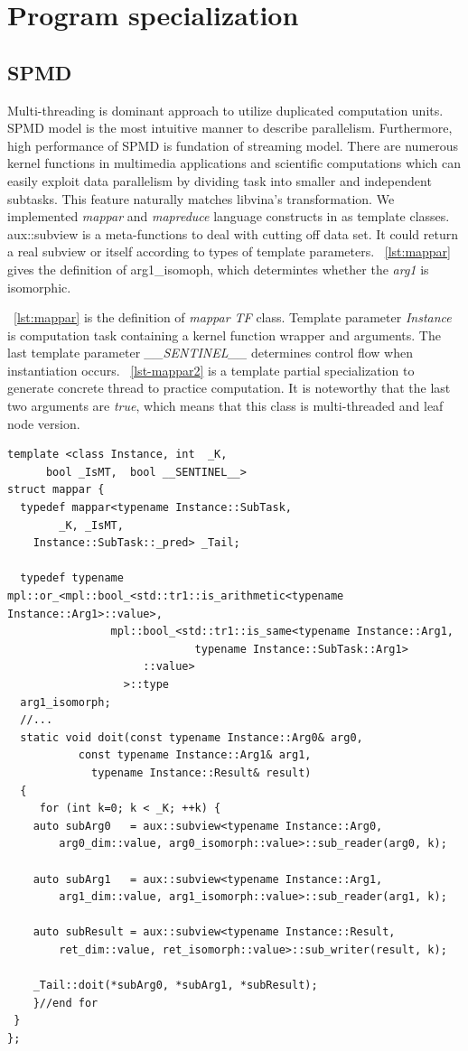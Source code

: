 \documentclass[10pt, conference, compsocconf]{IEEEtran}
\begin{document}
\section{Program specialization}
\subsection{SPMD}
Multi-threading is dominant approach to utilize duplicated computation units. SPMD model is the most intuitive manner to describe parallelism. Furthermore, high performance of SPMD is fundation of streaming model. There are numerous kernel functions in multimedia applications and scientific computations which can easily exploit data parallelism by dividing task into smaller and independent subtasks. This feature naturally matches libvina's transformation. We implemented \emph{mappar} and \emph{mapreduce} language constructs in \cite{b1} as template classes. aux::subview is a meta-functions to deal with cutting off data set. It could return a real subview or itself according to types of template parameters. ~\ref{lst:mappar} gives the definition of arg1\_isomoph, which determintes whether the \textit{arg1} is isomorphic.

~\ref{lst:mappar} is the definition of \emph{mappar TF} class. Template parameter \emph{Instance} is computation task containing a kernel function wrapper and arguments. The last template parameter \emph{\_\_SENTINEL\_\_} determines control flow when instantiation occurs. ~\ref{lst-mappar2} is a template partial specialization to generate concrete thread to practice computation. It is noteworthy that the last two arguments are \emph{true}, which means that this class is multi-threaded and leaf node version. 

\makebox[3.1\width]{\hrulefill}
\begin{verbatim}
template <class Instance, int  _K,
	  bool _IsMT,  bool __SENTINEL__>
struct mappar {
  typedef mappar<typename Instance::SubTask, 
        _K, _IsMT, 
	Instance::SubTask::_pred> _Tail;

  typedef typename mpl::or_<mpl::bool_<std::tr1::is_arithmetic<typename Instance::Arg1>::value>,
			    mpl::bool_<std::tr1::is_same<typename Instance::Arg1, 
							 typename Instance::SubTask::Arg1>
					 ::value>
			      >::type
  arg1_isomorph;
  //...
  static void doit(const typename Instance::Arg0& arg0, 
		   const typename Instance::Arg1& arg1, 
		     typename Instance::Result& result)
  {
     for (int k=0; k < _K; ++k) {
	auto subArg0   = aux::subview<typename Instance::Arg0, 
	    arg0_dim::value, arg0_isomorph::value>::sub_reader(arg0, k);
	  
	auto subArg1   = aux::subview<typename Instance::Arg1,
	    arg1_dim::value, arg1_isomorph::value>::sub_reader(arg1, k); 
	  
	auto subResult = aux::subview<typename Instance::Result,
	    ret_dim::value, ret_isomorph::value>::sub_writer(result, k);

	_Tail::doit(*subArg0, *subArg1, *subResult);
    }//end for
 }
};
\end{verbatim}
\begin{center}
\label{lst:mappar}
\end{center}
\end{document}

